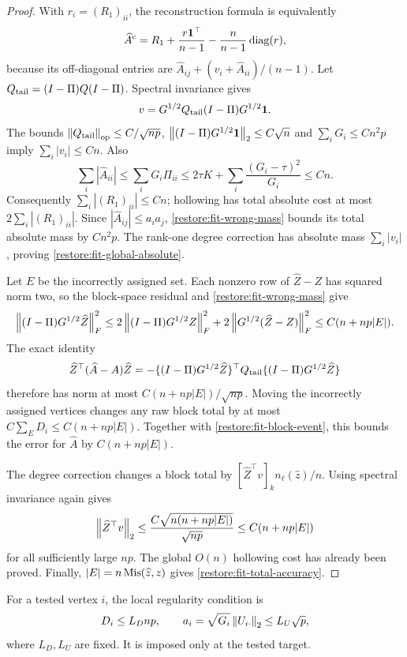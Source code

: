 \begin{proof}
With $r_i=(R_1)_{ii}$, the reconstruction formula is equivalently
\[
 \widehat A^{\mathrm{c}}=R_1+\frac{r\mathbf 1^\top}{n-1}
                   -\frac n{n-1}\operatorname{diag}(r),
\]
because its off-diagonal entries are $\widehat A_{ij}+(v_i+\widehat A_{ii})/(n-1)$.
Let $Q_{\rm tail}=(I-\Pi)Q(I-\Pi)$. Spectral invariance gives
\[
 v=G^{1/2}Q_{\rm tail}(I-\Pi)G^{1/2}\mathbf 1.
\]
The bounds $\left\lVert Q_{\rm tail}\right\rVert_{\mathrm{op}}\le C/\sqrt{np}$,
$\left\lVert(I-\Pi)G^{1/2}\mathbf 1\right\rVert_2\le C\sqrt n$ and
$\sum_iG_i\le Cn^2p$ imply $\sum_i|v_i|\le Cn$.
Also
\[
 \sum_i|\widehat A_{ii}|\le\sum_iG_i\Pi_{ii}
 \le2\tau K+\sum_i\frac{(G_i-\tau)^2}{G_i}\le Cn.
\]
Consequently $\sum_i|(R_1)_{ii}|\le Cn$; hollowing has total
absolute cost at most $2\sum_i|(R_1)_{ii}|$.
Since $|\widehat A_{ij}|\le a_ia_j$, \cref{restore:fit-wrong-mass} bounds
its total absolute mass by $Cn^2p$. The rank-one degree correction
has absolute mass $\sum_i|v_i|$, proving
\eqref{restore:fit-global-absolute}.

Let $E$ be the incorrectly assigned set. Each nonzero row of
$\widehat Z-Z$ has squared norm two, so the block-space residual and
\cref{restore:fit-wrong-mass} give
\[
 \left\lVert(I-\Pi)G^{1/2}\widehat Z\right\rVert_F^2
 \le 2\left\lVert(I-\Pi)G^{1/2}Z\right\rVert_F^2
       +2\left\lVert G^{1/2}(\widehat Z-Z)\right\rVert_F^2
 \le C(n+np|E|).
\]
The exact identity
\[
 \widehat Z^\top(\widehat A-A)\widehat Z
 =-\{(I-\Pi)G^{1/2}\widehat Z\}^\top Q_{\rm tail}
       \{(I-\Pi)G^{1/2}\widehat Z\}
\]
therefore has norm at most $C(n+np|E|)/\sqrt{np}$.
Moving the incorrectly assigned vertices changes any raw block total
by at most $C\sum_E D_i\le C(n+np|E|)$.
Together with \eqref{restore:fit-block-event}, this bounds the error
for $\widehat A$ by $C(n+np|E|)$.

The degree correction changes a block total by
$[\widehat Z^\top v]_k n_\ell(\widehat z)/n$.
Using spectral invariance again gives
\[
 \left\lVert\widehat Z^\top v\right\rVert_2
 \le \frac{C\sqrt{n(n+np|E|)}}{\sqrt{np}}
 \le C(n+np|E|)
\]
for all sufficiently large $np$. The global $O(n)$ hollowing cost
has already been proved. Finally, $|E|=n\operatorname{Mis}(\widehat z,z)$ gives
\eqref{restore:fit-total-accuracy}.
\end{proof}

For a tested vertex $i$, the local regularity condition is
\begin{equation}\label{restore:fit-local-row}
 D_i\le L_Dnp,\qquad
 a_i=\sqrt{G_i}\left\lVert U_{i\cdot}\right\rVert_2\le L_U\sqrt p,
\end{equation}
where $L_D,L_U$ are fixed. It is imposed only at the tested target.

